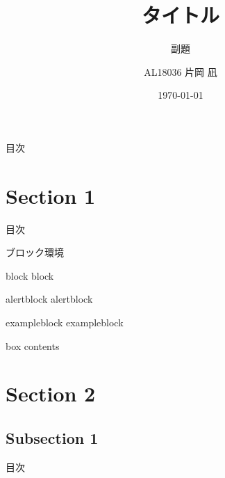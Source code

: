 \documentclass[aspectratio=169, dvipdfmx, 17pt, xcolor={svgnames,dvipsnames}]{beamer}
\title[Short title]{タイトル}
\subtitle{副題}
\author[Kataoka Nagi]{AL18036 片岡 凪}
\institute[AL18036]{芝浦工業大学 工学部 情報工学科 4年}
\date{\today}
\begin{document}
\maketitle

\begin{frame}{目次}
  \tableofcontents
\end{frame}

\section{Section 1}
\begin{frame}{目次}
  \tableofcontents[currentsection]
\end{frame}

\begin{frame}{ブロック環境}
  \begin{block}{block}
    block
  \end{block}
  \begin{alertblock}{alertblock}
    alertblock
  \end{alertblock}
  \begin{exampleblock}{exampleblock}
    exampleblock
  \end{exampleblock}
  \begin{tcolorbox}[colframe=green,
      colback=green!10!white,
      colbacktitle=green!40!white,
      coltitle=black, fonttitle=\bfseries,
      title=My box]
    box contents
  \end{tcolorbox}
\end{frame}

\section{Section 2}
\subsection{Subsection 1}
\begin{frame}{目次}
  \tableofcontents[currentsection]
\end{frame}
\end{document}
